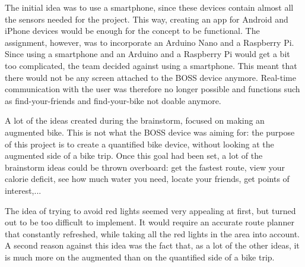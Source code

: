 The initial idea was to use a smartphone, since these devices contain almost all the sensors needed for the project. 
This way, creating an app for Android and iPhone devices would be enough for the concept to be functional. 
The assignment, however, was to incorporate an Arduino Nano and a Raspberry Pi. 
Since using a smartphone and an Arduino and a Raspberry Pi would get a bit too complicated, the team decided against using a smartphone. 
This meant that there would not be any screen attached to the BOSS device anymore. 
Real-time communication with the user was therefore no longer possible and functions such as find-your-friends and find-your-bike not doable anymore. 

A lot of the ideas created during the brainstorm, focused on making an augmented bike. 
This is not what the BOSS device was aiming for: the purpose of this project is to create a quantified bike device, without looking at the augmented side of a bike trip. 
Once this goal had been set, a lot of the brainstorm ideas could be thrown overboard: get the fastest route, view your calorie deficit, see how much water you need, locate your friends, get points of interest,...

The idea of trying to avoid red lights seemed very appealing at first, but turned out to be too difficult to implement. 
It would require an accurate route planner that constantly refreshed, while taking all the red lights in the area into account. 
A second reason against this idea was the fact that, as a lot of the other ideas, it is much more on the augmented than on the quantified side of a bike trip. 
